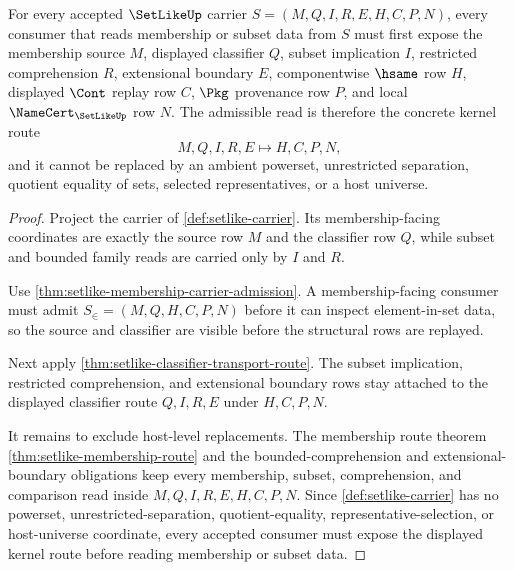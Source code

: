 \begin{theorem}
\label{thm:setlike-membership-kernel-obligations}
For every accepted $\SetLikeUp$ carrier $S=(M,Q,I,R,E,H,C,P,N)$, every consumer that reads membership or subset data from $S$ must first expose the membership source $M$, displayed classifier $Q$, subset implication $I$, restricted comprehension $R$, extensional boundary $E$, componentwise $\hsame$ row $H$, displayed $\Cont$ replay row $C$, $\Pkg$ provenance row $P$, and local $\NameCert_{\SetLikeUp}$ row $N$. The admissible read is therefore the concrete kernel route
$$
M,Q,I,R,E \longmapsto H,C,P,N ,
$$
and it cannot be replaced by an ambient powerset, unrestricted separation, quotient equality of sets, selected representatives, or a host universe.
\end{theorem}
\begin{proof}
Project the carrier of \autoref{def:setlike-carrier}. Its membership-facing coordinates are exactly the source row $M$ and the classifier row $Q$, while subset and bounded family reads are carried only by $I$ and $R$.

Use \autoref{thm:setlike-membership-carrier-admission}. A membership-facing consumer must admit $S_{\in}=(M,Q,H,C,P,N)$ before it can inspect element-in-set data, so the source and classifier are visible before the structural rows are replayed.

Next apply \autoref{thm:setlike-classifier-transport-route}. The subset implication, restricted comprehension, and extensional boundary rows stay attached to the displayed classifier route $Q,I,R,E$ under $H,C,P,N$.

It remains to exclude host-level replacements. The membership route theorem \autoref{thm:setlike-membership-route} and the bounded-comprehension and extensional-boundary obligations keep every membership, subset, comprehension, and comparison read inside $M,Q,I,R,E,H,C,P,N$. Since \autoref{def:setlike-carrier} has no powerset, unrestricted-separation, quotient-equality, representative-selection, or host-universe coordinate, every accepted consumer must expose the displayed kernel route before reading membership or subset data.
\end{proof}
